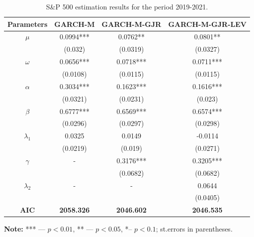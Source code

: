 \documentclass[authoryear, 1p]{elsarticle}
\numberwithin{equation}{section}
\begin{document}
\begin{table}[h!]
\begin{center}
\caption{S\&P 500 estimation results for the period 2019-2021.}
\label{tab:tab_5}
\begin{tabular*}{\textwidth}{cccc}
\hline
\hline
\textbf{Parameters} & \textbf{GARCH-M}  & \textbf{GARCH-M-GJR} & \textbf{GARCH-M-GJR-LEV} \\
\hline
\hline
$\mu$                  & 0.0994***         & 0.0762**             & 0.0801**                 \\
                    & (0.032)           & (0.0319)             & (0.0327)                 \\
$\omega$               & 0.0656***         & 0.0718***            & 0.0711***                \\
                    & (0.0108)          & (0.0115)             & (0.0115)                 \\
$\alpha$               & 0.3034***         & 0.1623***            & 0.1616***                \\
                    & (0.0321)          & (0.0231)             & (0.023)                  \\
$\beta$                & 0.6777***         & 0.6569***            & 0.6574***                \\
                    & (0.0296)          & (0.0297)             & (0.0298)                 \\
$\lambda_{1}$              & 0.0325            & 0.0149               & -0.0114                  \\
                    & (0.0219)          & (0.019)              & (0.0271)                 \\
$\gamma$               & -                 & 0.3176***            & 0.3205***                \\
                    &                   & (0.0682)             & (0.0682)                 \\
$\lambda_{2}$           & -                 & -                    & 0.0644                   \\
                    &                   &                      & (0.0405)                 \\
\hline
\textbf{AIC}        & \textbf{2058.326} & \textbf{2046.602}    & \textbf{2046.535}        \\
\hline
\hline
\end{tabular*}
\end{center}
\footnotesize
\renewcommand{\baselineskip}{11pt}
\textbf{Note:} *** —  $p<0.01$, ** —  $p < 0.05$, *– $p < 0.1$; st.errors in parentheses.
\end{table}
\end{document}

